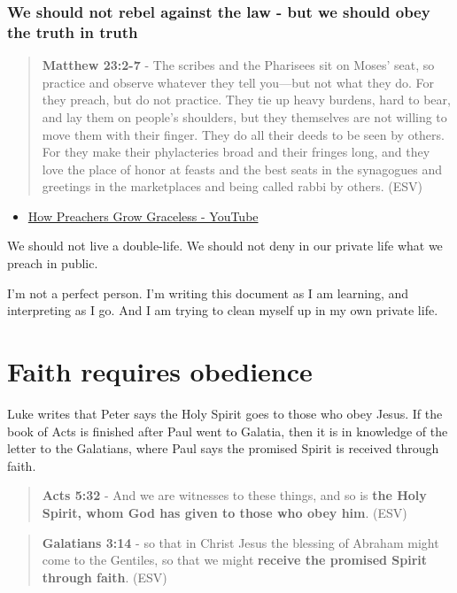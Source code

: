 \documentclass[11pt]{article}
\begin{document}
\subsubsection{We should not rebel against the law - but we should obey the truth in truth}
\label{sec:org7556659}
\begin{quote}
\textbf{Matthew 23:2-7} - The scribes and the Pharisees sit on Moses' seat, so practice and observe whatever they tell you—but not what they do. For they preach, but do not practice. They tie up heavy burdens, hard to bear, and lay them on people's shoulders, but they themselves are not willing to move them with their finger. They do all their deeds to be seen by others. For they make their phylacteries broad and their fringes long, and they love the place of honor at feasts and the best seats in the synagogues and greetings in the marketplaces and being called rabbi by others. (ESV)
\end{quote}

\begin{itemize}
\item \href{https://www.youtube.com/watch?v=alOI2zxIPgc}{How Preachers Grow Graceless - YouTube}
\end{itemize}

We should not live a double-life.
We should not deny in our private life what we preach in public.

I'm not a perfect person. I'm writing this document as I am learning, and interpreting as I go.
And I am trying to clean myself up in my own private life.

\section{Faith requires obedience}
\label{sec:org7576518}
Luke writes that Peter says the Holy Spirit goes to those who obey Jesus.
If the book of Acts is finished after Paul went to Galatia, then it is in knowledge of the letter to the Galatians, where Paul says the promised Spirit is received through faith.

\begin{quote}
\textbf{Acts 5:32} - And we are witnesses to these things, and so is \textbf{the Holy Spirit, whom God has given to those who obey him}. (ESV)
\end{quote}

\begin{quote}
\textbf{Galatians 3:14} - so that in Christ Jesus the blessing of Abraham might come to the Gentiles, so that we might \textbf{receive the promised Spirit through faith}. (ESV)
\end{quote}
\end{document}
